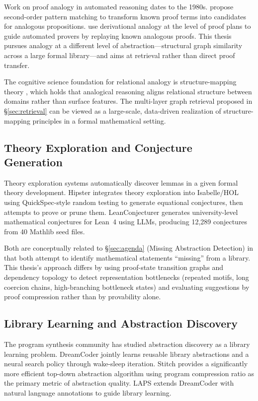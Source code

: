 \documentclass[12pt, a4paper]{article}
\begin{document}
Work on proof analogy in automated reasoning dates to the 1980s.
\citet{boydelatour1987} propose second-order pattern matching to transform
known proof terms into candidates for analogous propositions.
\citet{melis1994} use derivational analogy at the level of proof plans to
guide automated provers by replaying known analogous proofs. This thesis
pursues analogy at a different level of abstraction---structural graph
similarity across a large formal library---and aims at retrieval rather than
direct proof transfer.

The cognitive science foundation for relational analogy is structure-mapping
theory \citep{gentner1983, falkenhainer1989sme}, which holds that analogical
reasoning aligns relational structure between domains rather than surface
features. The multi-layer graph retrieval proposed in \S\ref{sec:retrieval}
can be viewed as a large-scale, data-driven realization of structure-mapping
principles in a formal mathematical setting.

\subsection{Theory Exploration and Conjecture Generation}

Theory exploration systems automatically discover lemmas in a given formal
theory development. Hipster \citep{johansson2014hipster} integrates theory
exploration into Isabelle/HOL using QuickSpec-style random testing to generate
equational conjectures, then attempts to prove or prune them. LeanConjecturer
\citep{onda2025leanconjecturer} generates university-level mathematical
conjectures for Lean~4 using LLMs, producing 12,289 conjectures from 40
Mathlib seed files.

Both are conceptually related to \S\ref{sec:agenda} (Missing Abstraction
Detection) in that both attempt to identify mathematical statements ``missing''
from a library. This thesis's approach differs by using proof-state transition
graphs and dependency topology to detect representation bottlenecks (repeated
motifs, long coercion chains, high-branching bottleneck states) and evaluating
suggestions by proof compression rather than by provability alone.

\subsection{Library Learning and Abstraction Discovery}

The program synthesis community has studied abstraction discovery as a
library learning problem. DreamCoder \citep{ellis2021dreamcoder} jointly
learns reusable library abstractions and a neural search policy through
wake-sleep iteration. Stitch \citep{bowers2023stitch} provides a
significantly more efficient top-down abstraction algorithm using program
compression ratio as the primary metric of abstraction quality. LAPS
\citep{wong2021laps} extends DreamCoder with natural language annotations to
guide library learning.
\end{document}
